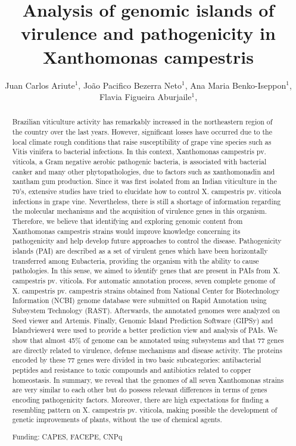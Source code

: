 \documentclass[twoside]{article}
\title{\vspace{-15mm}\fontsize{24pt}{10pt}\selectfont\textbf{ Analysis of genomic islands of virulence and pathogenicity in Xanthomonas campestris }} %
\author{ Juan Carlos Ariute$^{1}$, João Pacifico Bezerra Neto$^{1}$, Ana Maria Benko-Iseppon$^{1}$, Flavia Figueira Aburjaile$^{1}$, }
\affil{ 1 Federal University of Pernambuco, Center of Biological Sciences, Genetics Dept.

 }
\date{}
\begin{document}
  
  
  \maketitle %
  
  
  \thispagestyle{fancy} %
  
  
  \begin{abstract}
  Brazilian viticulture activity has remarkably increased in the northeastern region of the
country over the last years. However, significant losses have occurred due to the local
climate rough conditions that raise susceptibility of grape vine species such as Vitis
vinifera to bacterial infections. In this context, Xanthomonas campestris pv. viticola, a
Gram negative aerobic pathogenic bacteria, is associated with bacterial canker and
many other phytopathologies, due to factors such as xanthomonadin and xantham gum
production. Since it was first isolated from an Indian viticulture in the 70’s, extensive
studies have tried to elucidate how to control X. campestris pv. viticola infections in
grape vine. Nevertheless, there is still a shortage of information regarding the molecular
mechanisms and the acquisition of virulence genes in this organism. Therefore, we
believe that identifying and exploring genomic content from Xanthomonas campestris
strains would improve knowledge concerning its pathogenicity and help develop future
approaches to control the disease. Pathogenicity islands (PAI) are described as a set of
virulent genes which have been horizontally transferred among Eubacteria, providing
the organism with the ability to cause pathologies. In this sense, we aimed to identify
genes that are present in PAIs from X. campestris pv. viticola. For automatic annotation
process, seven complete genome of X. campestris pv. campestris strains obtained from
National Center for Biotechnology Information (NCBI) genome database were submitted
on Rapid Annotation using Subsystem Technology (RAST). Afterwards, the annotated
genomes were analyzed on Seed viewer and Artemis. Finally, Genomic Island
Prediction Software (GIPSy) and Islandviewer4 were used to provide a better prediction
view and analysis of PAIs. We show that almost 45\% of genome can be annotated
using subsystems and that 77 genes are directly related to virulence, defense
mechanisms and disease activity. The proteins encoded by these 77 genes were
divided in two basic subcategories: antibacterial peptides and resistance to toxic
compounds and antibiotics related to copper homeostasis. In summary, we reveal that
the genomes of all seven Xanthomonas strains are very similar to each other but do
possess relevant differences in terms of genes encoding pathogenicity factors.
Moreover, there are high expectations for finding a resembling pattern on X. campestris
pv. viticola, making possible the development of genetic improvements of plants,
without the use of chemical agents.
  
  Funding: CAPES, FACEPE, CNPq \\ 
  \end{abstract}
  
\end{document}
